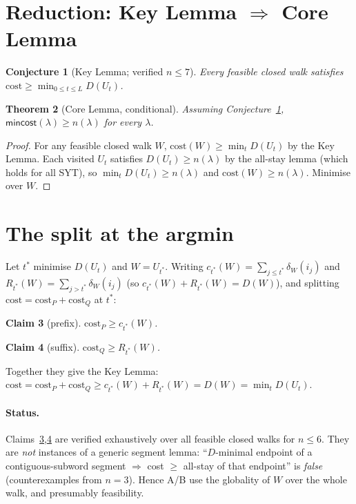 \documentclass[11pt]{article}
\theoremstyle{plain}
\newtheorem{theorem}{Theorem}
\newtheorem{claim}[theorem]{Claim}
\newtheorem{conjecture}[theorem]{Conjecture}
\theoremstyle{remark}
\newcommand{\mincost}{\mathsf{mincost}}
\newcommand{\cost}{\mathrm{cost}}
\begin{document}
\section{Reduction: Key Lemma $\Rightarrow$ Core Lemma}

\begin{conjecture}[Key Lemma; verified $n\le7$]\label{conj:key}
Every feasible closed walk satisfies $\cost\ge\min_{0\le t\le L}D(U_t)$.
\end{conjecture}

\begin{theorem}[Core Lemma, conditional]\label{thm:core}
Assuming Conjecture~\ref{conj:key}, $\mincost(\lambda)\ge n(\lambda)$ for every $\lambda$.
\end{theorem}
\begin{proof}
For any feasible closed walk $W$, $\cost(W)\ge\min_t D(U_t)$ by the Key Lemma. Each visited
$U_t$ satisfies $D(U_t)\ge n(\lambda)$ by the all-stay lemma (which holds for all SYT),
so $\min_t D(U_t)\ge n(\lambda)$ and $\cost(W)\ge n(\lambda)$. Minimise over $W$.
\end{proof}

\section{The split at the argmin}
Let $t^\ast$ minimise $D(U_t)$ and $W=U_{t^\ast}$. Writing
$c_{t^\ast}(W)=\sum_{j\le t^\ast}\delta_W(i_j)$ and $R_{t^\ast}(W)=\sum_{j>t^\ast}\delta_W(i_j)$
(so $c_{t^\ast}(W)+R_{t^\ast}(W)=D(W)$), and splitting $\cost=\cost_P+\cost_Q$ at $t^\ast$:
\begin{claim}[prefix]\label{cl:B} $\cost_P\ge c_{t^\ast}(W)$.\end{claim}
\begin{claim}[suffix]\label{cl:A} $\cost_Q\ge R_{t^\ast}(W)$.\end{claim}
Together they give the Key Lemma:
$\cost=\cost_P+\cost_Q\ge c_{t^\ast}(W)+R_{t^\ast}(W)=D(W)=\min_tD(U_t)$.

\paragraph{Status.} Claims~\ref{cl:B},\ref{cl:A} are verified exhaustively over all feasible
closed walks for $n\le6$. They are \emph{not} instances of a generic segment lemma:
``$D$-minimal endpoint of a contiguous-subword segment $\Rightarrow$ cost $\ge$ all-stay of
that endpoint'' is \emph{false} (counterexamples from $n=3$). Hence A/B use the globality of
$W$ over the whole walk, and presumably feasibility.
\end{document}
